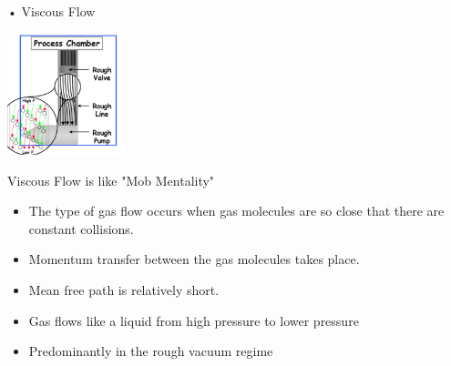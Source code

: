 \documentclass[11]{beamer}
\begin{document}
\begin{frame}{• Viscous Flow}

\begin{center}
   			\includegraphics[width=0.25\textwidth]{ViscousFlow.png}
\end{center}





\begin{exampleblock}{Viscous Flow is like "Mob Mentality"}
 
	\begin{itemize}
	\item  The type of gas flow occurs when gas molecules are so close that there are constant collisions.
	\item  Momentum transfer between the gas molecules takes place.
    \item  Mean free path is relatively short.
    \item  Gas flows like a liquid from high pressure to lower pressure
    \item  Predominantly in the rough vacuum regime

	\end{itemize}
	


\end{exampleblock}

		


\end{frame}
\end{document}
